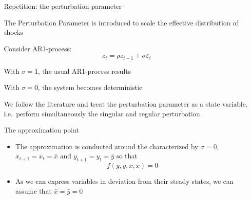 \begin{frame}{Repetition: the perturbation parameter}
  \begin{witemize}
    \item The Perturbation Parameter is introduced to scale the effective distribution of shocks
    \item Consider AR1-process:
    \begin{equation}
      z_t=\rho z_{t-1}+\sigma \varepsilon_t
    \end{equation}
    \item With $\sigma=1$, the usual AR1-process results
    \item With $\sigma=0$, the system becomes deterministic
    \item We follow the literature and treat the perturbation parameter as a state variable, i.e.\ perform simultaneously the singular and regular perturbation
  \end{witemize}
\end{frame}

\begin{frame}{The approximation point}
  \begin{itemize}
    \item The approximation is conducted around the  characterized by $\sigma=0$, ${x_{t + 1}} = {x_t} = \bar x$ and ${y_{t + 1}} = {y_t} = \bar y$ so that
          \[
            f\left( {\bar y,\bar y,\bar x,\bar x} \right) = 0
          \]
    \item As we can express variables in deviation from their steady states, we can assume that $\bar x=\bar y=0$
  \end{itemize}
\end{frame}

